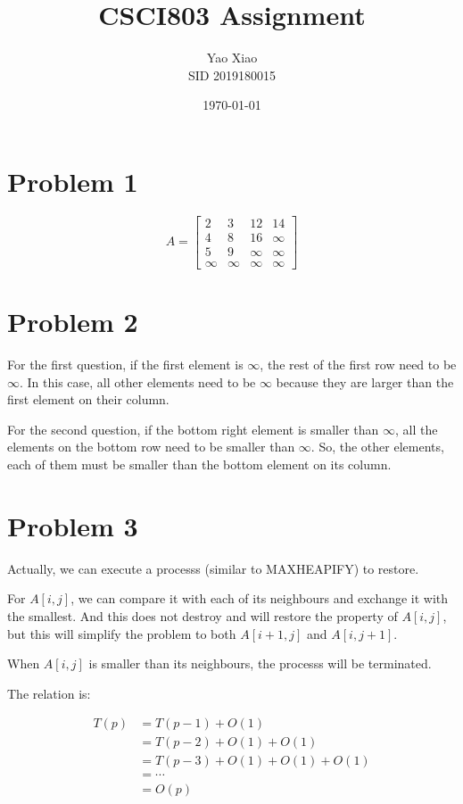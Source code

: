 \documentclass{article}
\title{CSCI803 Assignment}
\author{Yao Xiao \\ SID 2019180015}
\date{\today}
\begin{document}
\maketitle

\section{Problem 1}
\begin{equation*}
    A={
    \left[ \begin{array}{cccc}
    2 & 3 & 12 & 14\\
    4 & 8 & 16 & \infty\\
    5 & 9 & \infty & \infty\\
    \infty & \infty & \infty & \infty
    \end{array} 
    \right ]}
\end{equation*}

\section{Problem 2}
For the first question, if the first element is $\infty$, the rest of the first row need to be $\infty$.
In this case, all other elements need to be $\infty$ because they are larger than the first element on their column.

For the second question, if the bottom right element is smaller than $\infty$, all the elements on the bottom row need to be smaller than $\infty$.
So, the other elements, each of them must be smaller than the bottom element on its column.

\section{Problem 3}
Actually, we can execute a processs (similar to MAXHEAPIFY) to restore.

For $A[i,j]$, we can compare it with each of its neighbours and exchange it with the smallest.
And this does not destroy and will restore the property of $A[i,j]$, but this will simplify the problem to both
$A[i+1, j]$ and $A[i, j+1]$.

When $A[i, j]$ is smaller than its neighbours, the processs will be terminated.

The relation is: 

\begin{equation}
\begin{aligned}
    T(p) &= T(p-1) + O(1)\\
    &= T(p-2) + O(1) + O(1)\\
    &= T(p-3) + O(1) + O(1) + O(1)\\
    &= \cdots\\
    &= O(p)
\end{aligned}
\end{equation}
\end{document}
